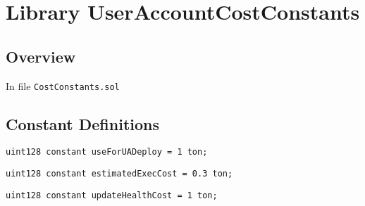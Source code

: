 
\chapter{Library UserAccountCostConstants}

\minitoc

\section{Overview}


In file {\tt CostConstants.sol}

\section{Constant Definitions}


\begin{lstlisting}[firstnumber=4]
    uint128 constant useForUADeploy = 1 ton;
\end{lstlisting}

\begin{lstlisting}[firstnumber=5]
    uint128 constant estimatedExecCost = 0.3 ton;
\end{lstlisting}

\begin{lstlisting}[firstnumber=6]
    uint128 constant updateHealthCost = 1 ton;
\end{lstlisting}
